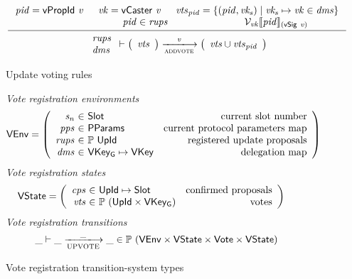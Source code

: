 \begin{figure}[htb]
  \begin{equation}
    \label{eq:rule:voting}
    \inference
    {
      \var{pid} = \vPropId{v} & \var{vk} = \vCaster{v} &
      \var{vts}_{\var{pid}} =
      \{ (\var{pid}, \var{vk_s}) \mid \var{vk_s} \mapsto \var{vk} \in \var{dms} \}\\
      & \var{pid} \in \var{rups} &
      \mathcal{V}_{\var{vk}}\serialised{\var{pid}}_{(\vSig{v})}\\
    }
    {
      {
        \begin{array}{l}
          \var{rups}\\
          \var{dms}
        \end{array}
      }
      \vdash
      {
        \left(
          \begin{array}{l}
            \var{vts}
          \end{array}
        \right)
      }
      \trans{addvote}{\var{v}}
      {
        \left(
          \begin{array}{l}
            \var{vts} \cup \var{vts}_{\var{pid}}\\
          \end{array}
        \right)
      }
    }
  \end{equation}
  \caption{Update voting rules}
  \label{fig:rules:voting}
\end{figure}

\clearpage

\begin{figure}[htb]
  \emph{Vote registration environments}
  \begin{align*}
    & \VEnv
      = \left(
      \begin{array}{r@{~\in~}lr}
        \var{s_n} & \Slot & \text{current slot number}\\
        \var{pps} & \PPMMap & \text{current protocol parameters map}\\
        \var{rups} & \powerset{\UPropId}
        & \text{registered update proposals}\\
        \var{dms} & \VKeyGen \mapsto \VKey & \text{delegation map}
      \end{array}\right)
  \end{align*}
  \emph{Vote registration states}
  \begin{align*}
    & \VState
      = \left(
      \begin{array}{r@{~\in~}lr}
        \var{cps} & \UPropId \mapsto \Slot & \text{confirmed proposals}\\
        \var{vts} & \powerset{(\UPropId \times \VKeyGen)} & \text{votes}
      \end{array}\right)
  \end{align*}
  \emph{Vote registration transitions}
    \begin{equation*}
    \_ \vdash \_ \trans{UPVOTE}{\_} \_ \in
    \powerset (\VEnv \times \VState \times \Vote \times \VState)
    \end{equation*}
  \caption{Vote registration transition-system types}
  \label{fig:ts-types:vote-reg}
\end{figure}

